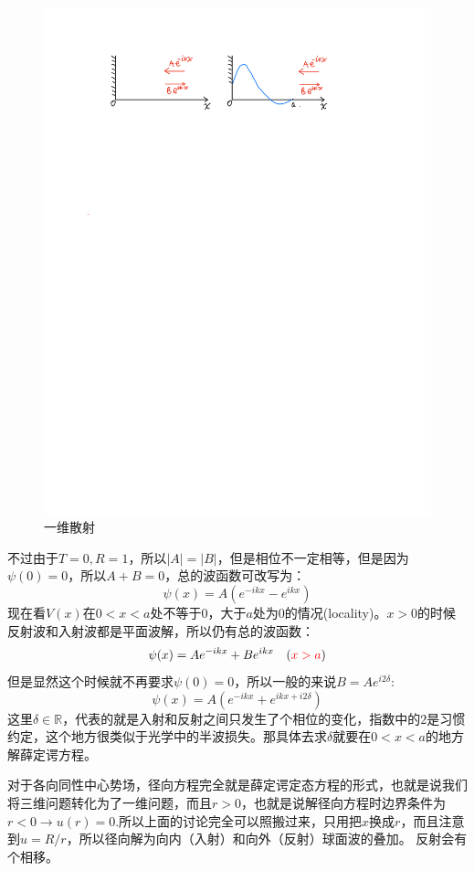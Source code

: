 \documentclass[a4paper,zihao=-4,linespread=1]{ctexrep}
\begin{document}
\begin{figure}[h]
{\begin{minipage}{6cm}
				\includegraphics[scale=0.7]{fig/11-2-b.pdf}   
			\end{minipage}
		}
		\caption{一维散射}   %
		\label{fig:11.2}  %
	\end{figure}
	
	不过由于$T=0,R=1$，所以$|A|=|B|$，但是相位不一定相等，但是因为$\psi(0)=0$，所以$A+B=0$，总的波函数可改写为：
	\[\psi(x)=A\left(e^{-ikx}-e^{ikx}\right)\]
	现在看$V(x)$在$0<x<a$处不等于0，大于$a$处为0的情况(locality)。$x>0$的时候反射波和入射波都是平面波解，所以仍有总的波函数：
	\[\psi(x)=Ae^{-ikx}+Be^{ikx}\quad ({\color{red}x>a})\]
	但是显然这个时候就不再要求$\psi(0)=0$，所以一般的来说$B=Ae^{i2\delta}$:
	\[\psi(x)=A\left(e^{-ikx}+e^{ikx+i2\delta}\right)\]
	这里$\delta\in\mathbb{R}$，代表的就是入射和反射之间只发生了个相位的变化，指数中的$2$是习惯约定，这个地方很类似于光学中的半波损失。那具体去求$\delta$就要在$0<x<a$的地方解薛定谔方程。
	
	对于各向同性中心势场，径向方程完全就是薛定谔定态方程的形式，也就是说我们将三维问题转化为了一维问题，而且$r>0$，也就是说解径向方程时边界条件为$r<0\rightarrow u(r)=0$.所以上面的讨论完全可以照搬过来，只用把$x$换成$r$，而且注意到$u=R/r$，所以径向解为向内（入射）和向外（反射）球面波的叠加。
	反射会有个相移。
	
\end{document}
